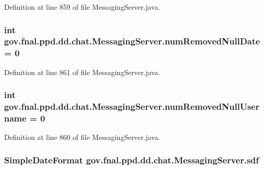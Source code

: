 Definition at line 859 of file Messaging\-Server.\-java.

\hypertarget{classgov_1_1fnal_1_1ppd_1_1dd_1_1chat_1_1MessagingServer_ab986fa29bcdc51bd186ad23e1c699426}{
\subsubsection[{num\-Removed\-Null\-Date}]{\setlength{\rightskip}{0pt plus 5cm}int gov.\-fnal.\-ppd.\-dd.\-chat.\-Messaging\-Server.\-num\-Removed\-Null\-Date = 0}}\label{classgov_1_1fnal_1_1ppd_1_1dd_1_1chat_1_1MessagingServer_ab986fa29bcdc51bd186ad23e1c699426}


Definition at line 861 of file Messaging\-Server.\-java.

\hypertarget{classgov_1_1fnal_1_1ppd_1_1dd_1_1chat_1_1MessagingServer_a84d7bc143f1eee20c7e39ce9024783c9}{
\subsubsection[{num\-Removed\-Null\-Username}]{\setlength{\rightskip}{0pt plus 5cm}int gov.\-fnal.\-ppd.\-dd.\-chat.\-Messaging\-Server.\-num\-Removed\-Null\-Username = 0}}\label{classgov_1_1fnal_1_1ppd_1_1dd_1_1chat_1_1MessagingServer_a84d7bc143f1eee20c7e39ce9024783c9}


Definition at line 860 of file Messaging\-Server.\-java.

\hypertarget{classgov_1_1fnal_1_1ppd_1_1dd_1_1chat_1_1MessagingServer_ac727c375b30722fb0d0a88f27eb97954}{
\subsubsection[{sdf}]{\setlength{\rightskip}{0pt plus 5cm}Simple\-Date\-Format gov.\-fnal.\-ppd.\-dd.\-chat.\-Messaging\-Server.\-sdf\hspace{0.3cm}{\ttfamily [protected]}}}\label{classgov_1_1fnal_1_1ppd_1_1dd_1_1chat_1_1MessagingServer_ac727c375b30722fb0d0a88f27eb97954}


